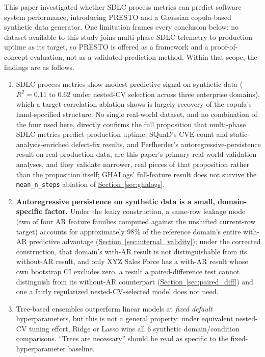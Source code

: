 \documentclass[technologies,article,submit,pdftex,moreauthors]{Definitions/mdpi}
\begin{document}
This paper investigated whether SDLC process metrics can predict software system performance, introducing PRESTO and a Gaussian copula-based synthetic data generator. One limitation frames every conclusion below: no dataset available to this study joins multi-phase SDLC telemetry to production uptime as its target, so PRESTO is offered as a framework and a proof-of-concept evaluation, not as a validated prediction method. Within that scope, the findings are as follows.

\begin{enumerate}
\def\labelenumi{\arabic{enumi}.}
\item
  SDLC process metrics show modest predictive signal on synthetic data (\(R^2 = 0.11\) to \(0.62\) under nested-CV selection across three enterprise domains), which a target-correlation ablation shows is largely recovery of the copula's hand-specified structure. No single real-world dataset, and no combination of the four used here, directly confirms the full proposition that multi-phase SDLC metrics predict production uptime; SQuaD's CVE-count and static-analysis-enriched defect-fix results, and Perfherder's autoregressive-persistence result on real production data, are this paper's primary real-world validation analyses, and they validate narrower, real pieces of that proposition rather than the proposition itself; GHALogs' full-feature result does not survive the \texttt{mean\_n\_steps} ablation of \hyperref[sec:ghalogs]{Section~\ref*{sec:ghalogs}}.
\item
  \textbf{Autoregressive persistence on synthetic data is a small, domain-specific factor.} Under the leaky construction, a same-row leakage mode (two of four AR feature families computed against the unshifted current-row target) accounts for approximately 98\% of the reference domain's entire with-AR predictive advantage (\hyperref[sec:internal_validity]{Section~\ref*{sec:internal_validity}}); under the corrected construction, that domain's with-AR result is not distinguishable from its without-AR result, and only XYZ Sales Force has a with-AR result whose own bootstrap CI excludes zero, a result a paired-difference test cannot distinguish from its without-AR counterpart (\hyperref[sec:paired_diff]{Section~\ref*{sec:paired_diff}}) and one a fairly regularized nested-CV-selected model does not need.
\item
  Tree-based ensembles outperform linear models at \emph{fixed default} hyperparameters, but this is not a general property: under equivalent nested-CV tuning effort, Ridge or Lasso wins all 6 synthetic domain/condition comparisons. ``Trees are necessary'' should be read as specific to the fixed-hyperparameter baseline.

\end{enumerate}
\end{document}
